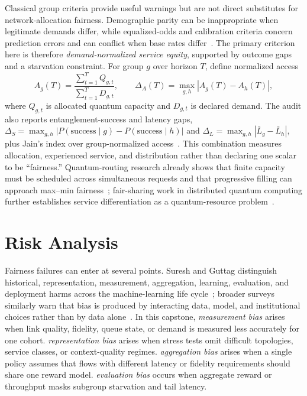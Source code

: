 \documentclass[10pt,conference]{IEEEtran}
\begin{document}
Classical group criteria provide useful warnings but are not direct substitutes for network-allocation fairness. Demographic parity can be inappropriate when legitimate demands differ, while equalized-odds and calibration criteria concern prediction errors and can conflict when base rates differ~\cite{hardt2016equality,chouldechova2017fair}. The primary criterion here is therefore \emph{demand-normalized service equity}, supported by outcome gaps and a starvation constraint. For group $g$ over horizon $T$, define normalized access
\begin{equation}
 A_g(T)=\frac{\sum_{t=1}^{T}Q_{g,t}}{\sum_{t=1}^{T}D_{g,t}},
 \qquad
 \Delta_A(T)=\max_{g,h}|A_g(T)-A_h(T)|,
\end{equation}
where $Q_{g,t}$ is allocated quantum capacity and $D_{g,t}$ is declared demand. The audit also reports entanglement-success and latency gaps, $\Delta_S=\max_{g,h}|P(\mathrm{success}\mid g)-P(\mathrm{success}\mid h)|$ and $\Delta_L=\max_{g,h}|\bar L_g-\bar L_h|$, plus Jain's index over group-normalized access~\cite{jain1984quantitative}. This combination measures allocation, experienced service, and distribution rather than declaring one scalar to be ``fairness.'' Quantum-routing research already shows that finite capacity must be scheduled across simultaneous requests and that progressive filling can approach max--min fairness~\cite{li2021effective}; fair-sharing work in distributed quantum computing further establishes service differentiation as a quantum-resource problem~\cite{cicconetti2023service}.

\section{Risk Analysis}

Fairness failures can enter at several points. Suresh and Guttag distinguish historical, representation, measurement, aggregation, learning, evaluation, and deployment harms across the machine-learning life cycle~\cite{suresh2021framework}; broader surveys similarly warn that bias is produced by interacting data, model, and institutional choices rather than by data alone~\cite{mehrabi2021survey}. In this capstone, \emph{measurement bias} arises when link quality, fidelity, queue state, or demand is measured less accurately for one cohort. \emph{representation bias} arises when stress tests omit difficult topologies, service classes, or context-quality regimes. \emph{aggregation bias} arises when a single policy assumes that flows with different latency or fidelity requirements should share one reward model. \emph{evaluation bias} occurs when aggregate reward or throughput masks subgroup starvation and tail latency.
\end{document}
